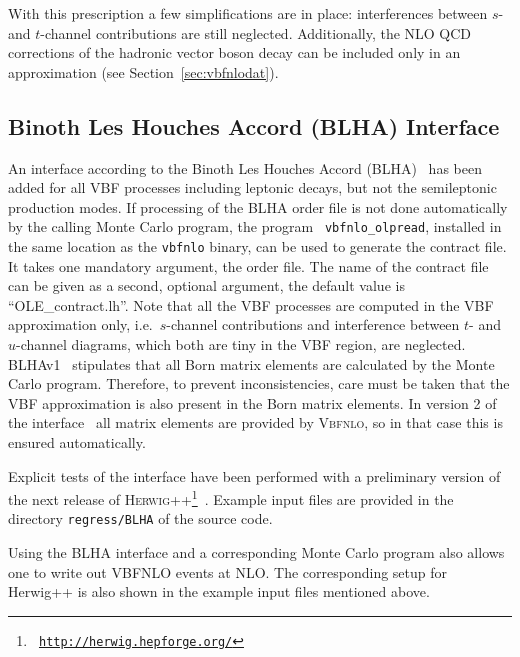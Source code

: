 \documentclass[english,12pt]{article}
\begin{document}
With this prescription a few simplifications are in place: interferences
between $s$- and $t$-channel contributions are still neglected. Additionally,
the NLO QCD corrections of the hadronic vector boson decay can be included only
in an approximation (see Section~\ref{sec:vbfnlodat}).

\subsection{Binoth Les Houches Accord (BLHA) Interface}
\label{sec:blha}
An interface according to the Binoth Les Houches Accord
(BLHA)~\cite{Binoth:2010xt,Alioli:2013nda} has been added for all VBF processes
including leptonic decays, but not the semileptonic production modes. If processing of the BLHA order file is not done
automatically by the calling Monte Carlo program, the program {\tt
vbfnlo\_olpread}, installed in the same location as the {\tt vbfnlo} binary,
can be used to generate the contract file. It takes one mandatory argument, the order file.
The name of the contract file can be given as a second, optional argument, the
default value is ``OLE\_contract.lh''.
Note that all the VBF processes are computed in the VBF approximation only,
i.e.\ $s$-channel contributions and interference between $t$- and $u$-channel
diagrams, which both are tiny in the VBF region, are neglected. BLHAv1~\cite{Binoth:2010xt} stipulates that all Born matrix elements are
calculated by the Monte Carlo program. Therefore, to prevent inconsistencies, care must be taken that the VBF approximation is also present in the Born matrix elements. In version 2 of the
interface~\cite{Alioli:2013nda} all matrix elements are provided by
\textsc{Vbfnlo}, so in that case this is ensured automatically.

Explicit tests of the interface have been performed with a preliminary
version of the next release of \textsc{Herwig++}\footnote{\tt
\href{http://herwig.hepforge.org/}{http://herwig.hepforge.org/}}~\cite{Bahr:2008pv}.
Example input files are provided in the directory {\tt regress/BLHA} of the source code.

Using the BLHA interface and a corresponding Monte Carlo program also allows
one to write out VBFNLO events at NLO. The corresponding setup for Herwig++ is
also shown in the example input files mentioned above.


\end{document}
